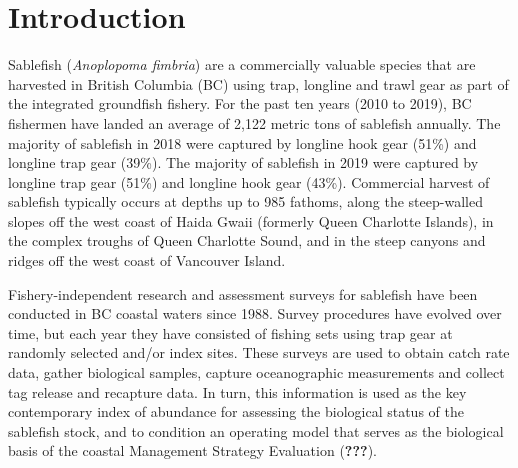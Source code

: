 \documentclass[12pt]{article}\usepackage[]{graphicx}\usepackage[]{color}
\begin{document}

\frontmatter


\renewcommand{\headrulewidth}{0.5pt}  %
\renewcommand{\footrulewidth}{0.5pt}  %

\hypertarget{introduction}{%
\section{Introduction}\label{introduction}}

Sablefish (\emph{Anoplopoma fimbria}) are a commercially valuable species that are harvested in British Columbia (BC) using trap, longline and trawl gear as part of the integrated groundfish fishery. For the past ten years (2010 to 2019), BC fishermen have landed an average of 2,122 metric tons of sablefish annually. The majority of sablefish in 2018 were captured by longline hook gear (51\%) and longline trap gear (39\%). The majority of sablefish in 2019 were captured by longline trap gear (51\%) and longline hook gear (43\%). Commercial harvest of sablefish typically occurs at depths up to 985 fathoms, along the steep-walled slopes off the west coast of Haida Gwaii (formerly Queen Charlotte Islands), in the complex troughs of Queen Charlotte Sound, and in the steep canyons and ridges off the west coast of Vancouver Island.

Fishery-independent research and assessment surveys for sablefish have been conducted in BC coastal waters since 1988. Survey procedures have evolved over time, but each year they have consisted of fishing sets using trap gear at randomly selected and/or index sites. These surveys are used to obtain catch rate data, gather biological samples, capture oceanographic measurements and collect tag release and recapture data. In turn, this information is used as the key contemporary index of abundance for assessing the biological status of the sablefish stock, and to condition an operating model that serves as the biological basis of the coastal Management Strategy Evaluation ({\textbf{???}}).
\end{document}
